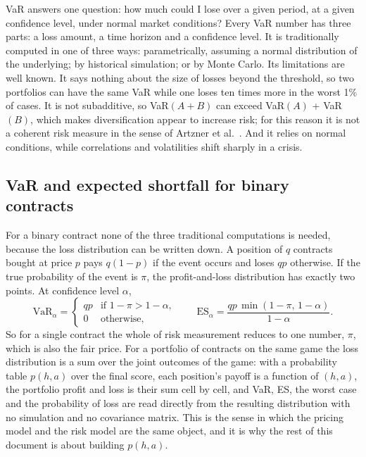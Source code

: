 VaR answers one question: how much could I lose over a given period, at a given confidence level, under normal market conditions? Every VaR number has three parts: a loss amount, a time horizon and a confidence level. It is traditionally computed in one of three ways: parametrically, assuming a normal distribution of the underlying; by historical simulation; or by Monte Carlo. Its limitations are well known. It says nothing about the size of losses beyond the threshold, so two portfolios can have the same VaR while one loses ten times more in the worst 1\% of cases. It is not subadditive, so VaR$(A+B)$ can exceed VaR$(A)$ + VaR$(B)$, which makes diversification appear to increase risk; for this reason it is not a coherent risk measure in the sense of Artzner et al.~\cite{artzner1999}. And it relies on normal conditions, while correlations and volatilities shift sharply in a crisis.

\subsection{VaR and expected shortfall for binary contracts}\label{sec:binaryvar}

For a binary contract none of the three traditional computations is needed, because the loss distribution can be written down. A position of $q$ contracts bought at price $p$ pays $q(1-p)$ if the event occurs and loses $qp$ otherwise. If the true probability of the event is $\pi$, the profit-and-loss distribution has exactly two points. At confidence level $\alpha$,
\[
\mathrm{VaR}_\alpha = \begin{cases} qp & \text{if } 1-\pi > 1-\alpha,\\ 0 & \text{otherwise,}\end{cases}
\qquad
\mathrm{ES}_\alpha = \frac{qp\,\min(1-\pi,\,1-\alpha)}{1-\alpha}.
\]
So for a single contract the whole of risk measurement reduces to one number, $\pi$, which is also the fair price. For a portfolio of contracts on the same game the loss distribution is a sum over the joint outcomes of the game: with a probability table $p(h,a)$ over the final score, each position's payoff is a function of $(h,a)$, the portfolio profit and loss is their sum cell by cell, and VaR, ES, the worst case and the probability of loss are read directly from the resulting distribution with no simulation and no covariance matrix. This is the sense in which the pricing model and the risk model are the same object, and it is why the rest of this document is about building $p(h,a)$.
